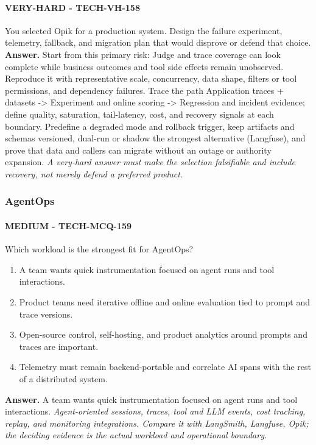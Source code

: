 \paragraph{VERY-HARD - TECH-VH-158} You selected Opik for a production system. Design the failure experiment, telemetry, fallback, and migration plan that would disprove or defend that choice.
\textbf{Answer.} Start from this primary risk: Judge and trace coverage can look complete while business outcomes and tool side effects remain unobserved. Reproduce it with representative scale, concurrency, data shape, filters or tool permissions, and dependency failures. Trace the path Application traces + datasets -> Experiment and online scoring -> Regression and incident evidence; define quality, saturation, tail-latency, cost, and recovery signals at each boundary. Predefine a degraded mode and rollback trigger, keep artifacts and schemas versioned, dual-run or shadow the strongest alternative (Langfuse), and prove that data and callers can migrate without an outage or authority expansion.
\textit{A very-hard answer must make the selection falsifiable and include recovery, not merely defend a preferred product.}
\subsubsection*{AgentOps}
\paragraph{MEDIUM - TECH-MCQ-159} Which workload is the strongest fit for AgentOps?
\begin{enumerate}[label=\Alph*.]
\item A team wants quick instrumentation focused on agent runs and tool interactions.
\item Product teams need iterative offline and online evaluation tied to prompt and trace versions.
\item Open-source control, self-hosting, and product analytics around prompts and traces are important.
\item Telemetry must remain backend-portable and correlate AI spans with the rest of a distributed system.
\end{enumerate}
\textbf{Answer.} A team wants quick instrumentation focused on agent runs and tool interactions.
\textit{Agent-oriented sessions, traces, tool and LLM events, cost tracking, replay, and monitoring integrations. Compare it with LangSmith, Langfuse, Opik; the deciding evidence is the actual workload and operational boundary.}
